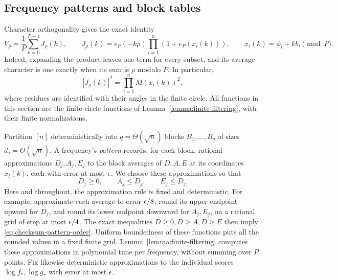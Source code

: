 \subsection{Frequency patterns and block tables}

Character orthogonality gives the exact identity
\begin{equation}
 V_\rho=\frac1P\sum_{k=0}^{P-1}J_\rho(k),\qquad
 J_\rho(k)=e_P(-k\rho)\prod_{i=1}^n(1+e_P(x_i(k))),\qquad
 x_i(k)=\phi_i+kb_i\pmod P.
 \label{eq:checksum-fourier}
\end{equation}
Indeed, expanding the product leaves one term for every subset, and its
average character is one exactly when its sum is $\rho$ modulo $P$.
In particular,
\begin{equation}
 |J_\rho(k)|^2=\prod_{i=1}^n M(x_i(k))^2,
 \label{eq:checksum-amplitude}
\end{equation}
where residues are identified with their angles in the finite circle.
All functions in this section are the finite-circle functions of
Lemma~\ref{lemma:finite-filtering}, with their finite normalizations.

Partition $[n]$ deterministically into $q=\Theta(\sqrt n)$ blocks
$B_1,\ldots,B_q$ of sizes $d_j=\Theta(\sqrt n)$.  A frequency's
\emph{pattern} records, for each block, rational approximations
$D_j,A_j,E_j$ to the block averages of $D,A,E$ at its coordinates
$x_i(k)$, each with error at most $\epsilon$.  We choose these approximations
so that
\begin{equation}
 D_j\ge0,\qquad A_j\le D_j,\qquad E_j\le D_j.
 \label{eq:checksum-pattern-order}
\end{equation}
Here and throughout, the approximation rule is fixed and deterministic.
For example, approximate each average to error $\epsilon/8$, round its
upper endpoint upward for $D_j$, and round its lower endpoint downward
for $A_j,E_j$, on a rational grid of step at most $\epsilon/4$.
The exact inequalities $D\ge0,D\ge A,D\ge E$ then imply
\eqref{eq:checksum-pattern-order}.  Uniform boundedness of these
functions puts all the rounded values in a fixed finite grid.
Lemma~\ref{lemma:finite-filtering} computes these approximations in
polynomial time per frequency, without summing over $P$ points.
Fix likewise deterministic approximations to the individual scores
$\log f_*,\log g_*$ with error at most $\epsilon$.

